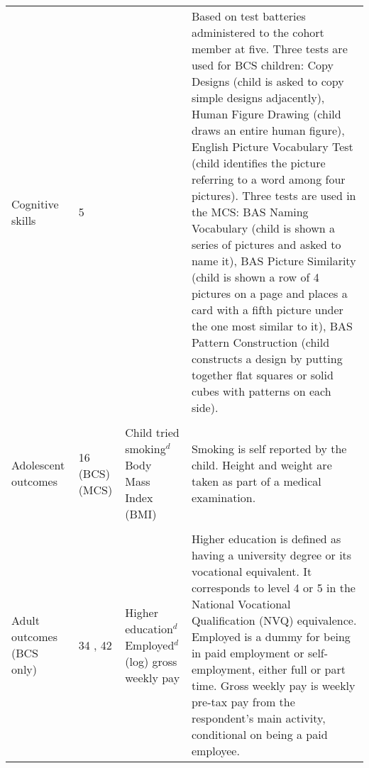\begin{sidewaystable}[ht!]
\begin{tabular}{L{.18\textwidth}C{.1\textwidth}L{.3\textwidth}L{.75\textwidth}}
Cognitive skills & 5 & & Based on test batteries administered to the cohort member at five. Three tests are used for BCS children: Copy Designs (child is asked to copy simple designs adjacently), Human Figure Drawing (child draws an entire human figure), English Picture Vocabulary Test (child identifies the picture referring to a word among four pictures). Three tests are used in the MCS: BAS Naming Vocabulary (child is shown a series of pictures and asked to name it), BAS Picture Similarity (child is shown a row of 4 pictures on a page and places a card with a fifth picture under the one most similar to it), BAS Pattern Construction (child constructs a design by putting together flat squares or solid cubes with patterns on each side).
 \\ \\[-1.5em]
Adolescent outcomes & 16 (BCS)  (MCS) & Child tried smoking$^d$ \newline Body Mass Index (BMI) & Smoking is self reported by the child. Height and weight are taken as part of a medical examination. \\ \\[-1.5em]
Adult outcomes (BCS only) & 34  , 42 & Higher education$^d$ \newline Employed$^d$ \newline (log) gross weekly pay & Higher education is defined as having a university degree or its vocational equivalent. It corresponds to level 4 or 5 in the National Vocational Qualification (NVQ) equivalence. Employed is a dummy for being in paid employment or self-employment, either full or part time. Gross weekly pay is weekly pre-tax pay from the respondent's main activity, conditional on being a paid employee. \\
\bottomrule
\end{tabular}
\end{sidewaystable}


